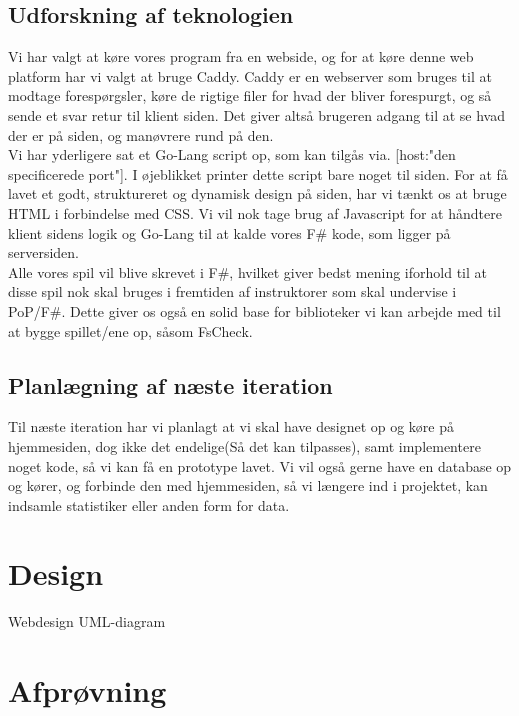 \documentclass[12pt, a4paper]{article}
\begin{document}
\subsection{Udforskning af teknologien}

Vi har valgt at køre vores program fra en webside, og for at køre denne web platform har vi valgt at bruge Caddy. Caddy er en webserver som bruges til at modtage forespørgsler, køre de rigtige filer for hvad der bliver forespurgt, og så sende et svar retur til klient siden. Det giver altså brugeren adgang til at se hvad der er på siden, og manøvrere rund på den.\\

Vi har yderligere sat et Go-Lang script op, som kan tilgås via. [host:"den specificerede port"]. I øjeblikket printer dette script bare noget til siden. For at få lavet et godt, struktureret og dynamisk design på siden, har vi tænkt os at bruge HTML i forbindelse med CSS. Vi vil nok tage brug af Javascript for at håndtere klient sidens logik og Go-Lang til at kalde vores F\# kode, som ligger på serversiden. \\

Alle vores spil vil blive skrevet i F\#, hvilket giver bedst mening iforhold til at disse spil nok skal bruges i fremtiden af instruktorer som skal undervise i PoP/F\#. Dette giver os også en solid base for biblioteker vi kan arbejde med til at bygge spillet/ene op, såsom FsCheck.

\subsection{Planlægning af næste iteration}
Til næste iteration har vi planlagt at vi skal have designet op og køre på hjemmesiden, dog ikke det endelige(Så det kan tilpasses), samt implementere noget kode, så vi kan få en prototype lavet.
Vi vil også gerne have en database op og kører, og forbinde den med hjemmesiden, så vi længere ind i projektet, kan indsamle statistiker eller anden form for data.

\section{Design}

Webdesign
UML-diagram

\section{Afprøvning}
\end{document}
